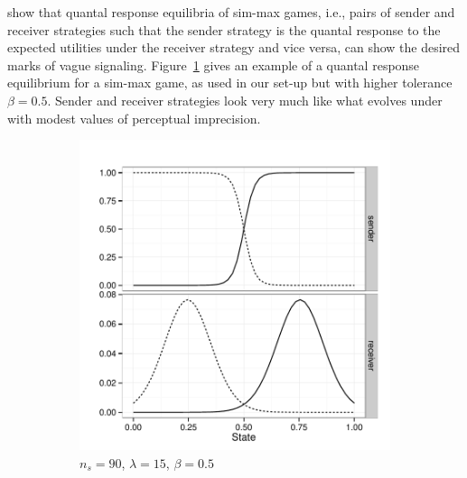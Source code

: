 \documentclass[fleqn,reqno,10pt]{article}
\newcommand{\rdd}{\acro{rdd}} %
\newcommand{\toler}{\ensuremath{\beta}} %
\newcommand{\ns}{\ensuremath{n_s}} %
\begin{document}
\citet{FrankeJager2010:Vagueness-Signa} show that quantal response
equilibria of sim-max games, i.e., pairs of sender and receiver
strategies such that the sender strategy is the quantal response to
the expected utilities under the receiver strategy and vice versa, can
show the desired marks of vague
signaling. Figure~\ref{fig:exampleQRE_stratsA} gives an example of a
quantal response equilibrium for a sim-max game, as used in our set-up
but with higher tolerance $\toler = 0.5$. Sender and receiver
strategies look very much like what evolves under \rdd with modest
values of perceptual imprecision. 

\begin{figure}
  \centering
  
  \begin{subfigure}[]{0.45\textwidth}
    \includegraphics[width=\textwidth]{plots/exampleStratQRE_tolerance05.pdf}
    \caption{$\ns = 90$, $\lambda = 15$, $\toler = 0.5$}
    \label{fig:exampleQRE_stratsA}
  \end{subfigure}
  \hfill
  \begin{subfigure}[]{0.45\textwidth}

\end{subfigure}
\end{figure}
\end{document}
